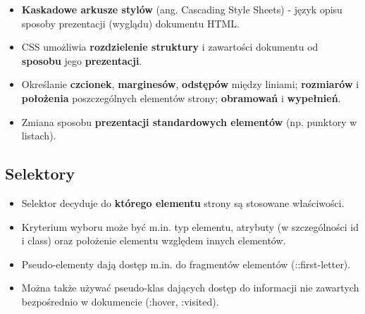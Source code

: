 \documentclass[../main.tex]{subfiles}
\begin{document}
    \begin{itemize}
        \item \textbf{Kaskadowe arkusze stylów} (ang. Cascading Style Sheets) - język opisu sposoby prezentacji (wyglądu) dokumentu HTML.
        \item CSS umożliwia \textbf{rozdzielenie struktury} i zawartości dokumentu od \textbf{sposobu} jego \textbf{prezentacji}.\\

        \item Określanie \textbf{czcionek}, \textbf{marginesów}, \textbf{odstępów} między liniami; \textbf{rozmiarów} i \textbf{położenia} poszczególnych elementów
        strony; \textbf{obramowań} i \textbf{wypełnień}.
        \item Zmiana sposobu \textbf{prezentacji standardowych elementów} (np. punktory w listach).
    \end{itemize}

    \subsection{Selektory}
    \begin{itemize}
        \item Selektor decyduje do \textbf{którego elementu} strony są stosowane właściwości.
        \item Kryterium wyboru może być m.in. typ elementu, atrybuty (w szczególności id i class) oraz położenie elementu względem innych elementów.
        \item Pseudo-elementy dają dostęp m.in. do fragmentów elementów (::first-letter).
        \item Można także używać pseudo-klas dających dostęp do informacji nie zawartych bezpośrednio w dokumencie (:hover, :visited).
    \end{itemize}
\end{document}
